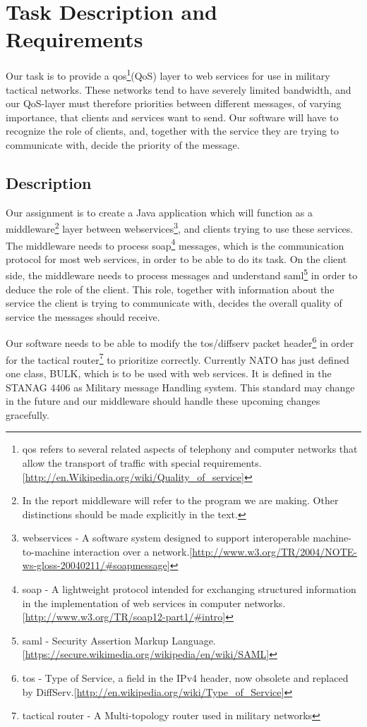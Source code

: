 \section{Task Description and Requirements}\label{Task Description and Requirements} 

    Our task is to provide a \gls{qos}\footnote{\gls{qos} refers to several related aspects of telephony and computer networks that allow the transport of traffic with special requirements.[\url{http://en.Wikipedia.org/wiki/Quality_of_service}]}(QoS) layer to web services for use in military tactical networks. These networks tend to have severely limited bandwidth, and our QoS-layer must therefore priorities between different messages, of varying importance, that clients and services want to send. Our software will have to recognize the role of clients, and, together with the service they are trying to communicate with, decide the priority of the message.
    
    \subsection{Description}\label{Description}        
    Our assignment is to create a Java application which will function as a \gls{middleware}\footnote{In the report \gls{middleware} will refer to the program we are making. Other distinctions should be made explicitly in the text.} layer between \glspl{webservice}\footnote{\glspl{webservice} - A software system designed to support interoperable machine-to-machine interaction over a network.[\url{http://www.w3.org/TR/2004/NOTE-ws-gloss-20040211/\#soapmessage}]}, and clients trying to use these services. The middleware needs to process \gls{soap}\footnote{\gls{soap} - A lightweight protocol intended for exchanging structured information in the implementation of web services in computer networks.[\url{http://www.w3.org/TR/soap12-part1/\#intro}]} messages, which is the communication protocol for most web services, in order to be able to do its task. On the client side, the middleware needs to process messages and understand \gls{saml}\footnote{\gls{saml} - Security Assertion Markup Language.[\url{https://secure.wikimedia.org/wikipedia/en/wiki/SAML}]} in order to deduce the role of the client. This role, together with information about the service the client is trying to communicate with, decides the overall quality of service the messages should receive. 

    Our software needs to be able to modify the \gls{tos}/\gls{diffserv} \gls{packet} header\footnote{\gls{tos} - Type of Service, a field in the IPv4 header, now obsolete and replaced by DiffServ.[\url{http://en.wikipedia.org/wiki/Type_of_Service}]} in order for the \gls{tactical router}\footnote{\Gls{tactical router} - A Multi-topology router used in military networks} to prioritize correctly. Currently NATO has just defined one class, BULK, which is to be used with web services. It is defined in the STANAG 4406 as Military message Handling system. This standard may change in the future and our middleware should handle these upcoming changes gracefully.


